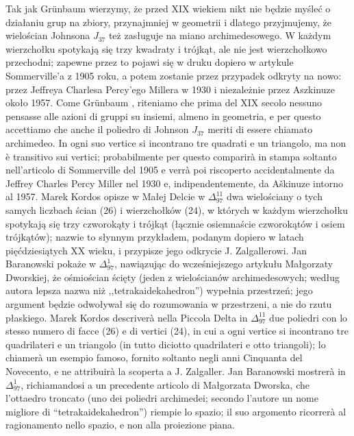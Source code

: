 Tak jak Grünbaum \cite{grunbaum_2009} wierzymy, że przed XIX wiekiem nikt nie będzie myśleć o działaniu grup na zbiory, przynajmniej w geometrii i dlatego przyjmujemy, że wielościan Johnsona $J_{37}$ też zasługuje na miano archimedesowego. %
W każdym wierzchołku spotykają się trzy kwadraty i trójkąt, ale nie jest wierzchołkowo przechodni; zapewne przez to pojawi się w druku dopiero w artykule Sommerville'a z 1905 roku, a potem zostanie przez przypadek odkryty na nowo: przez Jeffreya Charlesa Percy'ego Millera w 1930 i niezależnie przez Aszkinuze około 1957. %
Come Grünbaum \cite{grunbaum_2009}, riteniamo che prima del XIX secolo nessuno pensasse alle azioni di gruppi su insiemi, almeno in geometria, e per questo accettiamo che anche il poliedro di Johnson $J_{37}$ meriti di essere chiamato archimedeo. %
In ogni suo vertice si incontrano tre quadrati e un triangolo, ma non è transitivo sui vertici; probabilmente per questo comparirà in stampa soltanto nell'articolo di Sommerville del 1905 e verrà poi riscoperto accidentalmente da Jeffrey Charles Percy Miller nel 1930 e, indipendentemente, da Aškinuze intorno al 1957. %
%
Marek Kordos opisze w Małej Delcie w $\Delta_{97}^{11}$ dwa wielościany o tych samych liczbach ścian (26) i wierzchołków (24), w których w każdym wierzchołku spotykają się trzy czworokąty i trójkąt (łącznie osiemnaście czworokątów i osiem trójkątów); nazwie to słynnym przykładem, podanym dopiero w latach pięćdziesiątych XX wieku, i przypisze jego odkrycie J. Zalgallerowi. %
Jan Baranowski pokaże w $\Delta_{97}^1$, nawiązując do wcześniejszego artykułu Małgorzaty Dworskiej, że ośmiościan ścięty (jeden z wielościanów archimedesowych; według autora lepsza nazwa niż ,,tetrakaidekahedron'') wypełnia przestrzeń; jego argument będzie odwoływał się do rozumowania w przestrzeni, a nie do rzutu płaskiego. %
Marek Kordos descriverà nella Piccola Delta in $\Delta_{97}^{11}$ due poliedri con lo stesso numero di facce (26) e di vertici (24), in cui a ogni vertice si incontrano tre quadrilateri e un triangolo (in tutto diciotto quadrilateri e otto triangoli); lo chiamerà un esempio famoso, fornito soltanto negli anni Cinquanta del Novecento, e ne attribuirà la scoperta a J. Zalgaller. %
Jan Baranowski mostrerà in $\Delta_{97}^1$, richiamandosi a un precedente articolo di Małgorzata Dworska, che l'ottaedro troncato (uno dei poliedri archimedei; secondo l'autore un nome migliore di ``tetrakaidekahedron'') riempie lo spazio; il suo argomento ricorrerà al ragionamento nello spazio, e non alla proiezione piana. %

